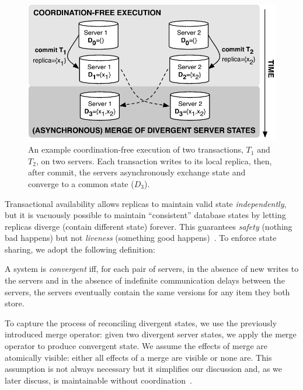 \begin{figure}
\begin{center}
\includegraphics[width=.85\columnwidth]{figs/replicas.pdf}
\end{center}\vspace{-2em}
\caption{An example coordination-free execution of two transactions,
  $T_1$ and $T_2$, on two servers. Each transaction writes to its
  local replica, then, after commit, the servers asynchronously
  exchange state and converge to a common state ($D_3$).}
\label{fig:replicas}
\end{figure}


 Transactional availability allows replicas to
maintain valid state \textit{independently}, but it is vacuously
possible to maintain ``consistent'' database states by letting
replicas diverge (contain different state) forever. This guarantees
\textit{safety} (nothing bad happens) but not \textit{liveness}
(something good happens)~\cite{schneider-concurrent}. To enforce state
sharing, we adopt the following definition:

\begin{definition}
  A system is \textit{convergent} iff, for each pair of servers, in
  the absence of new writes to the servers and in the
  absence of indefinite communication delays between the servers,
  the servers eventually contain the same versions for any item
  they both store.
\end{definition}

To capture the process of reconciling divergent states, we use the
previously introduced merge operator: given two divergent server
states, we apply the merge operator to produce convergent state. We
assume the effects of merge are atomically visible: either all effects
of a merge are visible or none are. This assumption is not always
necessary but it simplifies our discussion and, as we later discuss,
is maintainable without coordination~\cite{ramp-txns,hat-vldb}.

